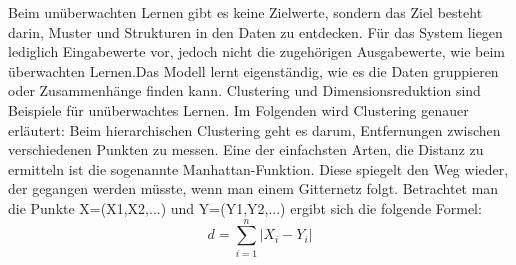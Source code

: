 Beim unüberwachten Lernen gibt es keine Zielwerte, sondern das Ziel besteht
darin, Muster und Strukturen in den Daten zu entdecken. Für das System liegen
lediglich Eingabewerte vor, jedoch nicht die zugehörigen Ausgabewerte, wie beim
überwachten Lernen.\cite{lanquillon2019grundzuge}Das Modell lernt eigenständig,
wie es die Daten gruppieren oder Zusammenhänge finden kann. Clustering und
Dimensionsreduktion sind Beispiele für unüberwachtes Lernen. Im Folgenden wird
Clustering genauer erläutert: Beim hierarchischen Clustering geht es darum,
Entfernungen zwischen verschiedenen Punkten zu messen. Eine der einfachsten
Arten, die Distanz zu ermitteln ist die sogenannte Manhattan-Funktion. Diese
spiegelt den Weg wieder, der gegangen werden müsste, wenn man einem Gitternetz
folgt. Betrachtet man die Punkte X=(X1,X2,...) und Y=(Y1,Y2,...) ergibt sich
die folgende Formel:
\begin{equation*}
    d = \sum_{i=1}^n |X_i -Y_i|
\end{equation*}